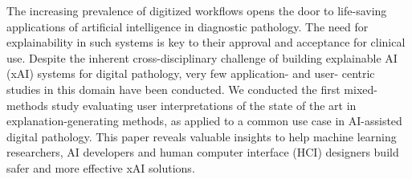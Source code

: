 The increasing prevalence of digitized workflows opens the door to life-saving applications of artificial intelligence in diagnostic pathology. The need for explainability in such systems is key to their approval and acceptance for clinical use. Despite the inherent cross-disciplinary challenge of building explainable AI (xAI) systems for digital pathology, very few application- and user- centric studies in this domain have been conducted. We conducted the first mixed-methods study evaluating user interpretations of the state of the art in explanation-generating methods, as applied to a common use case in AI-assisted digital pathology. This paper reveals valuable insights to help machine learning researchers, AI developers and human computer interface (HCI) designers build safer and more effective xAI solutions.